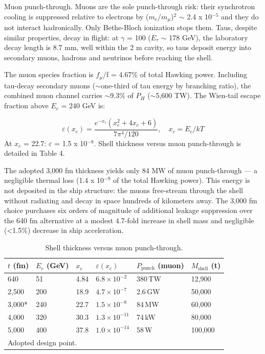 \documentclass[12pt,a4paper]{article}
\begin{document}
Muon punch-through. Muons are the sole punch-through risk: their synchrotron cooling is suppressed relative to electrons by ($m_e$/$m_{\mu}$)$^{2}$ $\sim$ 2.4 x 10$^{-5}$ and they do not interact hadronically. Only Bethe-Bloch ionization stops them. Taus, despite similar properties, decay in flight: at $\gamma$ = 100 ($E_{\tau}$ $\sim$ 178 GeV), the laboratory decay length is 8.7 mm, well within the 2 m cavity, so taus deposit energy into secondary muons, hadrons and neutrinos before reaching the shell.

The muon species fraction is $f_{\mu}$/f = 4.67\% of total Hawking power. Including tau-decay secondary muons ($\sim$one-third of tau energy by branching ratio), the combined muon channel carries $\sim$9.3\% of $P_H$ ($\sim$5,600 TW). The Wien-tail escape fraction above $E_c$ = 240 GeV is:

\begin{equation}
\varepsilon(x_c) = \frac{e^{-x_c}(x_c^2 + 4x_c + 6)}{7\pi^4/120}, \quad x_c = E_c/kT
\end{equation}
At $x_c$ = 22.7: $\varepsilon$ = 1.5 x 10$^{-8}$. Shell thickness versus muon punch-through is detailed in Table 4.

The adopted 3,000 fm thickness yields only 84 MW of muon punch-through --- a negligible thermal loss (1.4 x 10$^{-9}$ of the total Hawking power). This energy is not deposited in the ship structure: the muons free-stream through the shell without radiating and decay in space hundreds of kilometers away. The 3,000 fm choice purchases six orders of magnitude of additional leakage suppression over the 640 fm alternative at a modest 4.7-fold increase in shell mass and negligible (<1.5\%) decrease in ship acceleration.


\begin{table}[h]
\centering
\caption{Shell thickness versus muon punch-through.}
\label{tab:punchthrough}
\small
\begin{tabular}{llllll}
\hline
\textbf{$t$ (fm)} & \textbf{$E_c$ (GeV)} & \textbf{$x_c$} & \textbf{$\varepsilon(x_c)$} & \textbf{$P_\text{punch}$ (muon)} & \textbf{$M_\text{shell}$ (t)} \\
\hline
640 & 51 & 4.84 & $6.8 \times 10^{-2}$ & 380\,TW & 12,900 \\
2,500 & 200 & 18.9 & $4.7 \times 10^{-7}$ & 2.6\,GW & 50,000 \\
3,000* & 240 & 22.7 & $1.5 \times 10^{-8}$ & 84\,MW & 60,000 \\
4,000 & 320 & 30.3 & $1.3 \times 10^{-11}$ & 74\,kW & 80,000 \\
5,000 & 400 & 37.8 & $1.0 \times 10^{-14}$ & 58\,W & 100,000 \\
\hline
\multicolumn{6}{l}{\footnotesize * Adopted design point.} \\
\end{tabular}
\end{table}
\end{document}
